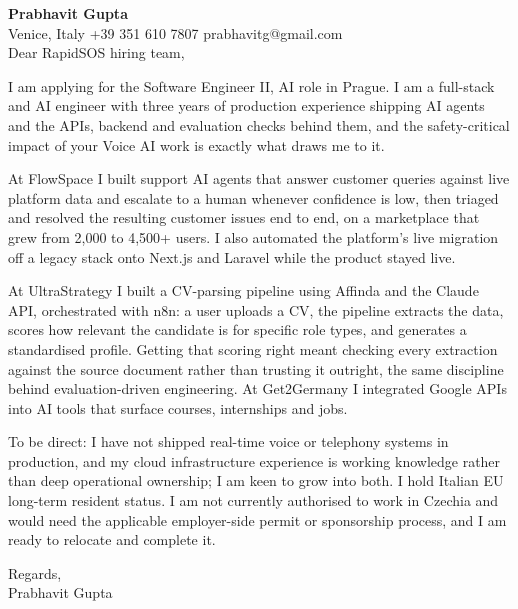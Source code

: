 \documentclass[a4paper,10.5pt]{article}
\begin{document}
\textbf{Prabhavit Gupta}\\
Venice, Italy \textbar{} +39 351 610 7807 \textbar{} prabhavitg@gmail.com\\[10pt]
Dear RapidSOS hiring team,

I am applying for the Software Engineer II, AI role in Prague. I am a full-stack and AI engineer with three years of production experience shipping AI agents and the APIs, backend and evaluation checks behind them, and the safety-critical impact of your Voice AI work is exactly what draws me to it.

At FlowSpace I built support AI agents that answer customer queries against live platform data and escalate to a human whenever confidence is low, then triaged and resolved the resulting customer issues end to end, on a marketplace that grew from 2,000 to 4,500+ users. I also automated the platform's live migration off a legacy stack onto Next.js and Laravel while the product stayed live.

At UltraStrategy I built a CV-parsing pipeline using Affinda and the Claude API, orchestrated with n8n: a user uploads a CV, the pipeline extracts the data, scores how relevant the candidate is for specific role types, and generates a standardised profile. Getting that scoring right meant checking every extraction against the source document rather than trusting it outright, the same discipline behind evaluation-driven engineering. At Get2Germany I integrated Google APIs into AI tools that surface courses, internships and jobs.

To be direct: I have not shipped real-time voice or telephony systems in production, and my cloud infrastructure experience is working knowledge rather than deep operational ownership; I am keen to grow into both. I hold Italian EU long-term resident status. I am not currently authorised to work in Czechia and would need the applicable employer-side permit or sponsorship process, and I am ready to relocate and complete it.

Regards,\\
Prabhavit Gupta
\end{document}
